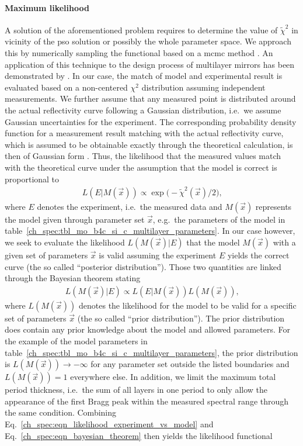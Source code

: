 \paragraph{Maximum likelihood}
A solution of the aforementioned problem requires to determine the value of $\tilde{\chi}^2$ in vicinity of the \gls{pso} solution or possibly the whole parameter space. We approach this by numerically sampling the functional based on a \gls{mcmc} method \cite{goodman_ensemble_2010}. An application of this technique to the design process of multilayer mirrors has been demonstrated by \textcite{hobson_markov-chain_2004}. In our case, the match of model and experimental result is evaluated based on a non-centered $\chi^2$ distribution assuming independent measurements. We further assume that any measured point is distributed around the actual reflectivity curve following a Gaussian distribution, i.e.~we assume Gaussian uncertainties for the experiment. The corresponding probability density function for a measurement result matching with the actual reflectivity curve, which is assumed to be obtainable exactly through the theoretical calculation, is then of Gaussian form \cite{abramowitz_handbook_1964}. Thus, the likelihood that the measured values match with the theoretical curve under the assumption that the model is correct is proportional to
\begin{align}
 L(E | M(\vec{x})) \propto \exp \big(- \tilde{\chi}^2(\vec{x}) / 2 \big) \text{,} \label{ch_spec:eqn_likelihood_experiment_vs_model}
\end{align}
where $E$ denotes the experiment, i.e.~the measured data and $M(\vec{x})$ represents the model given through parameter set $\vec{x}$, e.g.~the parameters of the model in table~\ref{ch_spec:tbl_mo_b4c_si_c_multilayer_parameters}. In our case however, we seek to evaluate the likelihood $L(M(\vec{x}) | E)$ that the model $M(\vec{x})$ with a given set of parameters $\vec{x}$ is valid assuming the experiment $E$ yields the correct curve (the so called ``posterior distribution''). Those two quantities are linked through the Bayesian theorem \cite{bayes_essay_1763, milton_introduction_2002} stating
\begin{align}
 L(M(\vec{x}) | E) \propto L(E | M(\vec{x})) L(M(\vec{x})) \text{,} \label{ch_spec:eqn_bayesian_theorem}
\end{align}
where $L(M(\vec{x}))$ denotes the likelihood for the model to be valid for a specific set of parameters $\vec{x}$ (the so called ``prior distribution''). The prior distribution does contain any prior knowledge about the model and allowed parameters. For the example of the model parameters in table~\ref{ch_spec:tbl_mo_b4c_si_c_multilayer_parameters}, the prior distribution is $L(M(\vec{x})) \rightarrow -\infty$ for any parameter set outside the listed boundaries and $L(M(\vec{x})) = 1$ everywhere else. In addition, we limit the maximum total period thickness, i.e.~the sum of all layers in one period to only allow the appearance of the first Bragg peak within the measured spectral range through the same condition. Combining Eq.~\eqref{ch_spec:eqn_likelihood_experiment_vs_model} and Eq.~\eqref{ch_spec:eqn_bayesian_theorem} then yields the likelihood functional
